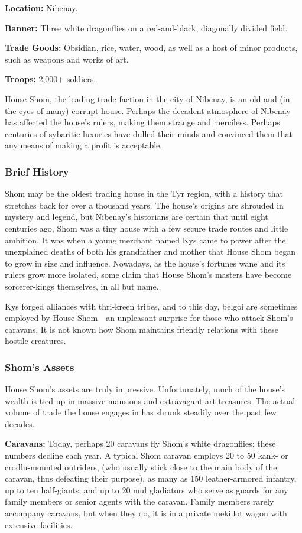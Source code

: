 \textbf{Location:} Nibenay.

\textbf{Banner:} Three white dragonflies on a red-and-black, diagonally divided field.

\textbf{Trade Goods:} Obsidian, rice, water, wood, as well as a host of minor products, such as weapons and works of art.

\textbf{Troops:} 2,000+ soldiers.

House Shom, the leading trade faction in the city of Nibenay, is an old and (in the eyes of many) corrupt house. Perhaps the decadent atmosphere of Nibenay has affected the house's rulers, making them strange and merciless. Perhaps centuries of sybaritic luxuries have dulled their minds and convinced them that any means of making a profit is acceptable.

\subsubsection{Brief History}
Shom may be the oldest trading house in the Tyr region, with a history that stretches back for over a thousand years. The house's origins are shrouded in mystery and legend, but Nibenay's historians are certain that until eight centuries ago, Shom was a tiny house with a few secure trade routes and little ambition. It was when a young merchant named Kys came to power after the unexplained deaths of both his grandfather and mother that House Shom began to grow in size and influence. Nowadays, as the house's fortunes wane and its rulers grow more isolated, some claim that House Shom's masters have become sorcerer-kings themselves, in all but name.

Kys forged alliances with thri-kreen tribes, and to this day, belgoi are sometimes employed by House Shom---an unpleasant surprise for those who attack Shom's caravans. It is not known how Shom maintains friendly relations with these hostile creatures.


\subsubsection{Shom's Assets}
House Shom's assets are truly impressive. Unfortunately, much of the house's wealth is tied up in massive mansions and extravagant art treasures. The actual volume of trade the house engages in has shrunk steadily over the past few decades.

\textbf{Caravans:} Today, perhaps 20 caravans fly Shom's white dragonflies; these numbers decline each year. A typical Shom caravan employs 20 to 50 kank- or crodlu-mounted outriders, (who usually stick close to the main body of the caravan, thus defeating their purpose), as many as 150 leather-armored infantry, up to ten half-giants, and up to 20 mul gladiators who serve as guards for any family members or senior agents with the caravan. Family members rarely accompany caravans, but when they do, it is in a private mekillot wagon with extensive facilities.

